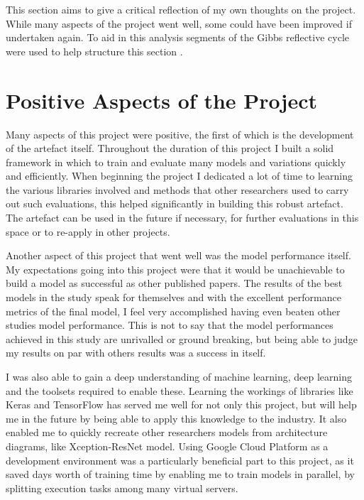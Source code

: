 This section aims to give a critical reflection of my own thoughts on the project. While many aspects of the project went well, some could have been improved if undertaken again. To aid in this analysis segments of the Gibbs reflective cycle were used to help structure this section \citep{gibbs1988learning}.

\section{Positive Aspects of the Project}
Many aspects of this project were positive, the first of which is the development of the artefact itself. Throughout the duration of this project I built a solid framework in which to train and evaluate many models and variations quickly and efficiently. When beginning the project I dedicated a lot of time to learning the various libraries involved and methods that other researchers used to carry out such evaluations, this helped significantly in building this robust artefact. The artefact can be used in the future if necessary, for further evaluations in this space or to re-apply in other projects.

Another aspect of this project that went well was the model performance itself. My expectations going into this project were that it would be unachievable to build a model as successful as other published papers. The results of the best models in the study speak for themselves and with the excellent performance metrics of the final model, I feel very accomplished having even beaten other studies model performance. This is not to say that the model performances achieved in this study are unrivalled or ground breaking, but being able to judge my results on par with others results was a success in itself.

I was also able to gain a deep understanding of machine learning, deep learning and the toolsets required to enable these. Learning the workings of libraries like Keras and TensorFlow has served me well for not only this project, but will help me in the future by being able to apply this knowledge to the industry. It also enabled me to quickly recreate other researchers models from architecture diagrams, like \cite{fitriasari2021improvement} Xception-ResNet model. Using Google Cloud Platform as a development environment was a particularly beneficial part to this project, as it saved days worth of training time by enabling me to train models in parallel, by splitting execution tasks among many virtual servers.

